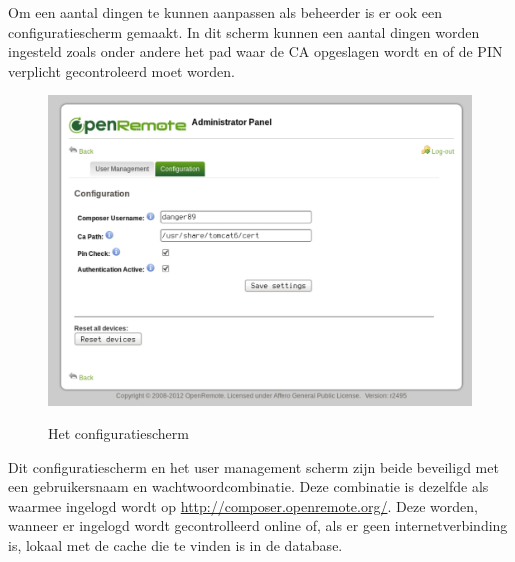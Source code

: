 \documentclass[]{article}
\begin{document}
Om een aantal dingen te kunnen aanpassen als beheerder is er ook een
configuratiescherm gemaakt. In dit scherm kunnen een aantal dingen worden
ingesteld zoals onder andere het pad waar de CA opgeslagen wordt en of de PIN
verplicht gecontroleerd moet worden.

\begin{figure}[h!]
  \centering
    \includegraphics[width=1\textwidth,keepaspectratio]{adminv2config.pdf}
  \label{fig:adminv2config}
  \caption{Het configuratiescherm}
\end{figure}

Dit configuratiescherm en het user management scherm zijn beide beveiligd met
een gebruikersnaam en wachtwoordcombinatie. Deze combinatie is dezelfde als
waarmee ingelogd wordt op \url{http://composer.openremote.org/}. Deze worden,
wanneer er ingelogd wordt gecontrolleerd online of, als er geen
internetverbinding is, lokaal met de cache die te vinden is in de database.
\end{document}
